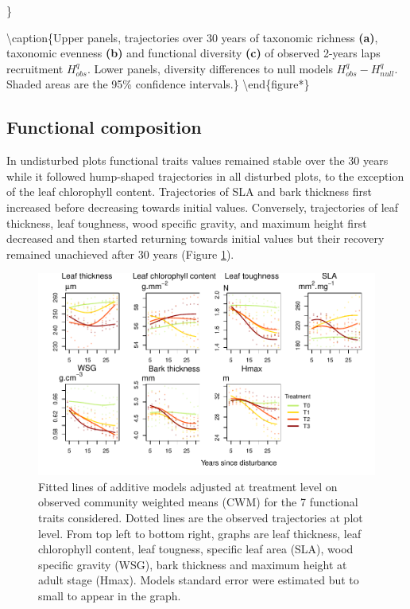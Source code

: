 \documentclass[fleqn,10pt]{ArtEcoFoG} %
\begin{document}
\}

\textbackslash{}caption\{Upper panels, trajectories over 30 years of
taxonomic richness \textbf{(a)}, taxonomic evenness \textbf{(b)} and
functional diversity \textbf{(c)} of observed 2-years laps recruitment
\(H_{obs}^q\). Lower panels, diversity differences to null models
\(H_{obs}^q - H_{null}^q\). Shaded areas are the 95\% confidence
intervals.\}\label{fig:DivTraj} \textbackslash{}end\{figure*\}

\subsection{Functional composition}\label{functional-composition}

In undisturbed plots functional traits values remained stable over the
30 years while it followed hump-shaped trajectories in all disturbed
plots, to the exception of the leaf chlorophyll content. Trajectories of
SLA and bark thickness first increased before decreasing towards initial
values. Conversely, trajectories of leaf thickness, leaf toughness, wood
specific gravity, and maximum height first decreased and then started
returning towards initial values but their recovery remained unachieved
after 30 years (Figure \ref{fig:CWM}).

\begin{figure}

{\centering \includegraphics{RecruitmentTrajectories_files/figure-latex/CWM-1} 

}

\caption{Fitted lines of additive models adjusted at treatment level on observed community weighted means (CWM) for the 7 functional traits considered. Dotted lines are the observed trajectories at plot level. From top left to bottom right, graphs are leaf thickness, leaf chlorophyll content, leaf tougness, specific leaf area (SLA), wood specific gravity (WSG), bark thickness and maximum height at adult stage (Hmax). Models standard error were estimated but to small to appear in the graph.}\label{fig:CWM}
\end{figure}
\end{document}
